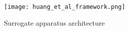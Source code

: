 \documentclass[12pt,a4paper,oneside,pdftex]{report}
\begin{document}
\begin{comment}
\begin{figure}[H]
\centering
\pgfdeclarelayer{marx}
\pgfsetlayers{main,marx}
\begin{tikzpicture}[
    start chain=going below,    %
    node distance=3mm and 30mm, %
    ]
\tikzset{
  base/.style={draw, on chain, on grid, align=center, minimum height=4ex},
  proc/.style={base, rectangle, minimum height=4em, text width=4em},
  cont/.style={base, rectangle, rounded corners, minimum height=4em, minimum width=6em, text width=6em},
  elli/.style={base, ellipse, minimum height=4.5em, text width=4.5em},
  line/.style={draw, thick, -latex'}
}
\node [proc] (desc) {Service description};
\node [proc] (tcs) {Configured test cases};
\node [proc, right=of desc] (gen) {Generator};
\node [proc] (ten) {Test engine};
\node [cont, right=of gen] (app) {Application container};
\node [proc] (sgt) {Surrogate};
\node [proc] (sen) {Surrogate engine};
\node [proc, right=of sgt] (rea) {Real component};
\path [line] (desc) -- (gen);
\path [line] (gen) -- (sgt);
\path [line] (tcs) -- (ten);
\path [line] (ten) -- (sen);
\path [line] (sgt) -- (sen);
\path [line] (sen) -- (sgt);
\end{tikzpicture}
\caption{Surrogate system architecture \citep{huang2008surrogate}} \label{fig:surrogate}
\end{figure}
\end{comment}

\begin{figure}[H]
  \begin{center}
    \texttt{[image: huang\_et\_al\_framework.png]}
    \caption{Surrogate apparatus architecture \citep{huang2008surrogate}}
    \label{fig:huang}
  \end{center}
\end{figure}


\begin{comment}
\begin{figure}[H]
  \begin{center}
    \texttt{[image: huang\_testing\_process.png]}
    \caption{The testing processes by \citet{huang2008surrogate}}
    \label{fig:huangtesting} 
  \end{center}
\end{figure}
\end{comment}
\end{document}

